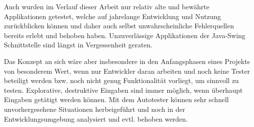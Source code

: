 Auch wurden im Verlauf dieser Arbeit nur relativ alte und bewährte
Applikationen getestet, welche auf jahrelange Entwicklung und Nutzung
zurückblicken können und daher auch selbst unwahrscheinliche
Fehlerquellen bereits erlebt und behoben haben. Unzuverlässige
Applikationen der Java-Swing Schnittstelle sind längst in Vergessenheit
geraten.

Das Konzept an sich wäre aber insbesondere in den Anfangsphasen
eines Projekts von besonderem Wert, wenn nur Entwickler daran
arbeiten und noch keine Tester beteiligt werden bzw. noch nicht
genug Funktionalität vorliegt, um sinnvoll zu testen. Explorative,
destruktive Eingaben sind immer möglich, wenn überhaupt
Eingaben getätigt werden können. Mit dem Autotester können
sehr schnell unvorhergesehene Situationen herbeigeführt
und noch in der Entwicklungsumgebung analysiert und evtl.
behoben werden.
